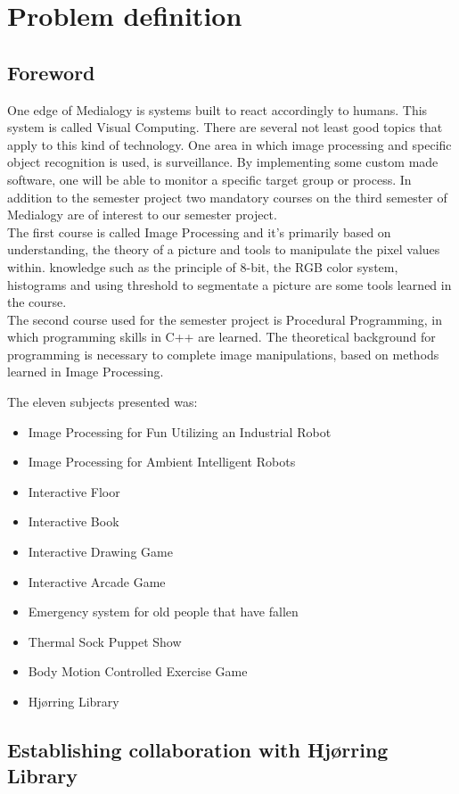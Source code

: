\chapter{Problem definition}
\section{Foreword}
One edge of Medialogy is systems built to react accordingly to humans. This system is called Visual Computing. There are several not least good topics that apply to this kind of technology. One area in which image processing and specific object recognition is used, is surveillance. By implementing some custom made software, one will be able to monitor a specific target group or process. In addition to the semester project two mandatory courses on the third semester of Medialogy are of interest to our semester project.\\
The first course is called Image Processing and it's primarily based on understanding, the theory of a picture and tools to manipulate the pixel values within. knowledge such as the principle of 8-bit, the RGB color system, histograms and using threshold to segmentate a picture are some tools learned in the course.\\
The second course used for the semester project is Procedural Programming, in which programming skills in C++ are learned. The theoretical background for programming is necessary to complete image manipulations, based on methods learned in Image Processing.

The eleven subjects presented was:

\begin{itemize}
\item Image Processing for Fun Utilizing an Industrial Robot
\item Image Processing for Ambient Intelligent Robots
\item Interactive Floor
\item Interactive Book
\item Interactive Drawing Game
\item Interactive Arcade Game
\item Emergency system for old people that have fallen
\item Thermal Sock Puppet Show
\item Body Motion Controlled Exercise Game
\item Hjørring Library
\end{itemize}

\section{Establishing collaboration with Hjørring Library}

